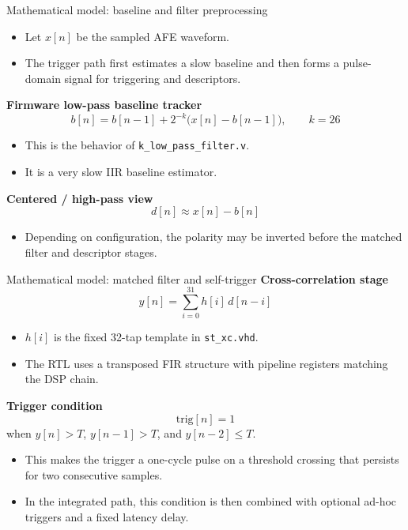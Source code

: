 \documentclass[aspectratio=169]{beamer}
\begin{document}
\begin{frame}{Mathematical model: baseline and filter preprocessing}
\small
\begin{itemize}
  \item Let \(x[n]\) be the sampled AFE waveform.
  \item The trigger path first estimates a slow baseline and then forms a pulse-domain signal for triggering and descriptors.
\end{itemize}

\vspace{1mm}
\textbf{Firmware low-pass baseline tracker}
\[
b[n] = b[n-1] + 2^{-k}\bigl(x[n] - b[n-1]\bigr), \qquad k = 26
\]

\begin{itemize}
  \item This is the behavior of \texttt{k\_low\_pass\_filter.v}.
  \item It is a very slow IIR baseline estimator.
\end{itemize}

\vspace{1mm}
\textbf{Centered / high-pass view}
\[
d[n] \approx x[n] - b[n]
\]

\begin{itemize}
  \item Depending on configuration, the polarity may be inverted before the matched filter and descriptor stages.
\end{itemize}
\end{frame}

\begin{frame}{Mathematical model: matched filter and self-trigger}
\small
\textbf{Cross-correlation stage}
\[
y[n] = \sum_{i=0}^{31} h[i]\,d[n-i]
\]

\begin{itemize}
  \item \(h[i]\) is the fixed 32-tap template in \texttt{st\_xc.vhd}.
  \item The RTL uses a transposed FIR structure with pipeline registers matching the DSP chain.
\end{itemize}

\vspace{1mm}
\textbf{Trigger condition}
\[
\mathrm{trig}[n] = 1
\]
when \(y[n] > T\), \(y[n-1] > T\), and \(y[n-2] \le T\).

\begin{itemize}
  \item This makes the trigger a one-cycle pulse on a threshold crossing that persists for two consecutive samples.
  \item In the integrated path, this condition is then combined with optional ad-hoc triggers and a fixed latency delay.
\end{itemize}
\end{frame}
\end{document}

